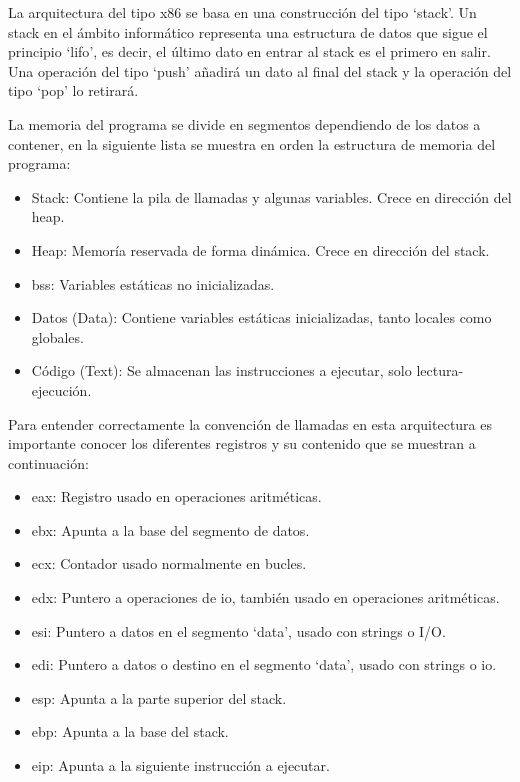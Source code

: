 La arquitectura del tipo x86 se basa en una construcción del tipo `stack'. Un stack en el ámbito informático representa una estructura de datos que sigue el principio `\acrfull{lifo}', es decir, el último dato en entrar al stack es el primero en salir. Una operación del tipo `push' añadirá un dato al final del stack y la operación del tipo `pop' lo retirará.

La memoria del programa se divide en segmentos dependiendo de los datos a contener, en la siguiente lista se muestra en orden la estructura de memoria del programa:
\begin{itemize}
    \item Stack: Contiene la pila de llamadas y algunas variables. Crece en dirección del heap.
    \item Heap: Memoría reservada de forma dinámica. Crece en dirección del stack.
    \item \acrfull{bss}: Variables estáticas no inicializadas.
    \item Datos (Data): Contiene variables estáticas inicializadas, tanto locales como globales.
    \item Código (Text): Se almacenan las instrucciones a ejecutar, solo lectura-ejecución.
\end{itemize}

Para entender correctamente la convención de llamadas en esta arquitectura es importante conocer los diferentes registros y su contenido que se muestran a continuación:
\begin{itemize}
    \item \acrfull{eax}: Registro usado en operaciones aritméticas.
    \item \acrfull{ebx}: Apunta a la base del segmento de datos.
    \item \acrfull{ecx}: Contador usado normalmente en bucles.
    \item \acrfull{edx}: Puntero a operaciones de \acrshort{io}, también usado en operaciones aritméticas.
    \item \acrfull{esi}: Puntero a datos en el segmento `data', usado con strings o I/O.
    \item \acrfull{edi}: Puntero a datos o destino en el segmento `data', usado con strings o \acrshort{io}.
    \item \acrfull{esp}: Apunta a la parte superior del stack.
    \item \acrfull{ebp}: Apunta a la base del stack.
    \item \acrfull{eip}: Apunta a la siguiente instrucción a ejecutar.
\end{itemize}

